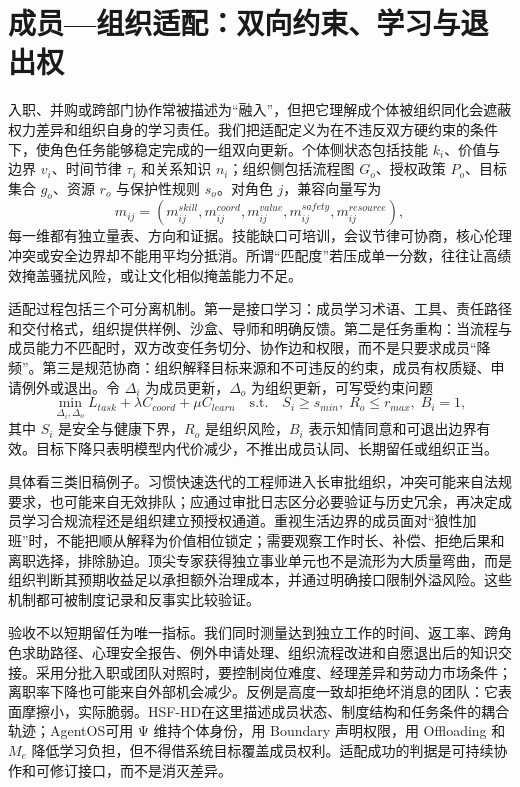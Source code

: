 \section{成员—组织适配：双向约束、学习与退出权}
\label{sec:organizational_capture_interlocking}

入职、并购或跨部门协作常被描述为“融入”，但把它理解成个体被组织同化会遮蔽权力差异和组织自身的学习责任。我们把适配定义为在不违反双方硬约束的条件下，使角色任务能够稳定完成的一组双向更新。个体侧状态包括技能 $k_i$、价值与边界 $v_i$、时间节律 $\tau_i$ 和关系知识 $n_i$；组织侧包括流程图 $G_o$、授权政策 $P_o$、目标集合 $g_o$、资源 $r_o$ 与保护性规则 $s_o$。对角色 $j$，兼容向量写为
\begin{equation}
 m_{ij}=(m^{skill}_{ij},m^{coord}_{ij},m^{value}_{ij},m^{safety}_{ij},m^{resource}_{ij}),
\end{equation}
每一维都有独立量表、方向和证据。技能缺口可培训，会议节律可协商，核心伦理冲突或安全边界却不能用平均分抵消。所谓“匹配度”若压成单一分数，往往让高绩效掩盖骚扰风险，或让文化相似掩盖能力不足。

适配过程包括三个可分离机制。第一是接口学习：成员学习术语、工具、责任路径和交付格式，组织提供样例、沙盒、导师和明确反馈。第二是任务重构：当流程与成员能力不匹配时，双方改变任务切分、协作边和权限，而不是只要求成员“降频”。第三是规范协商：组织解释目标来源和不可违反的约束，成员有权质疑、申请例外或退出。令 $\Delta_i$ 为成员更新，$\Delta_o$ 为组织更新，可写受约束问题
\begin{equation}
 \min_{\Delta_i,\Delta_o} L_{task}+\lambda C_{coord}+\mu C_{learn}\quad\text{s.t.}\quad S_i\geq s_{min},\;R_o\leq r_{max},\;B_i=1,
\end{equation}
其中 $S_i$ 是安全与健康下界，$R_o$ 是组织风险，$B_i$ 表示知情同意和可退出边界有效。目标下降只表明模型内代价减少，不推出成员认同、长期留任或组织正当。

具体看三类旧稿例子。习惯快速迭代的工程师进入长审批组织，冲突可能来自法规要求，也可能来自无效排队；应通过审批日志区分必要验证与历史冗余，再决定成员学习合规流程还是组织建立预授权通道。重视生活边界的成员面对“狼性加班”时，不能把顺从解释为价值相位锁定；需要观察工作时长、补偿、拒绝后果和离职选择，排除胁迫。顶尖专家获得独立事业单元也不是流形为大质量弯曲，而是组织判断其预期收益足以承担额外治理成本，并通过明确接口限制外溢风险。这些机制都可被制度记录和反事实比较验证。

验收不以短期留任为唯一指标。我们同时测量达到独立工作的时间、返工率、跨角色求助路径、心理安全报告、例外申请处理、组织流程改进和自愿退出后的知识交接。采用分批入职或团队对照时，要控制岗位难度、经理差异和劳动力市场条件；离职率下降也可能来自外部机会减少。反例是高度一致却拒绝坏消息的团队：它表面摩擦小，实际脆弱。HSF-HD在这里描述成员状态、制度结构和任务条件的耦合轨迹；AgentOS可用 Ψ 维持个体身份，用 Boundary 声明权限，用 Offloading 和 $M_e$ 降低学习负担，但不得借系统目标覆盖成员权利。适配成功的判据是可持续协作和可修订接口，而不是消灭差异。

